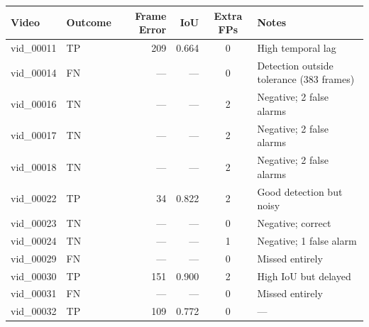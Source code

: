 \begin{table}[!htbp]
	\centering
	\small
	\begin{tabularx}{\textwidth}{l l r r c >{\raggedright\arraybackslash}X}
		\toprule
		\textbf{Video} & \textbf{Outcome} & \textbf{Frame Error} & \textbf{IoU} & \textbf{Extra FPs} & \textbf{Notes}                            \\
		\midrule
		vid\_00011     & TP               & 209                  & 0.664        & 0                  & High temporal lag                         \\
		\addlinespace
		vid\_00014     & FN               & ---                  & ---          & 0                  & Detection outside tolerance (383 frames)  \\
		\addlinespace
		vid\_00016     & TN               & ---                  & ---          & 2                  & Negative; 2 false alarms                  \\
		\addlinespace
		vid\_00017     & TN               & ---                  & ---          & 2                  & Negative; 2 false alarms                  \\
		\addlinespace
		vid\_00018     & TN               & ---                  & ---          & 2                  & Negative; 2 false alarms                  \\
		\addlinespace
		vid\_00022     & TP               & 34                   & 0.822        & 2                  & Good detection but noisy                  \\
		\addlinespace
		vid\_00023     & TN               & ---                  & ---          & 0                  & Negative; correct                         \\
		\addlinespace
		vid\_00024     & TN               & ---                  & ---          & 1                  & Negative; 1 false alarm                   \\
		\addlinespace
		vid\_00029     & FN               & ---                  & ---          & 0                  & Missed entirely                           \\
		\addlinespace
		vid\_00030     & TP               & 151                  & 0.900        & 2                  & High IoU but delayed                      \\
		\addlinespace
		vid\_00031     & FN               & ---                  & ---          & 0                  & Missed entirely                           \\
		\addlinespace
		vid\_00032     & TP               & 109                  & 0.772        & 0                  & ---                                       \\

\end{tabularx}
\end{table}
